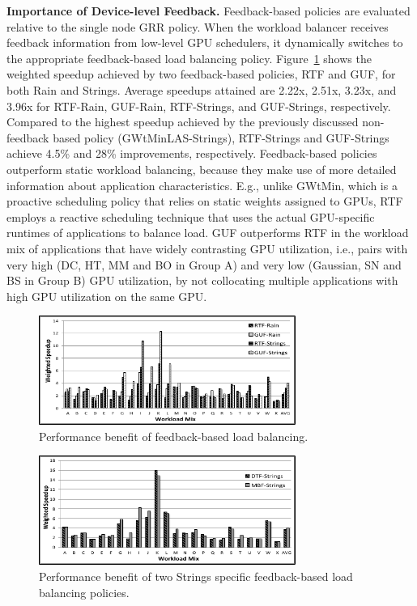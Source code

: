 \textbf{Importance of Device-level Feedback.} Feedback-based policies are evaluated relative to the single node GRR policy. When the workload  balancer  receives  feedback  information from low-level GPU schedulers, it dynamically switches to the appropriate  feedback-based  load  balancing policy.  Figure~\ref{fig:strings_exp6} shows the weighted speedup achieved by two feedback-based policies, RTF and GUF, for both Rain and Strings. Average speedups attained are 2.22x, 2.51x, 3.23x, and 3.96x for RTF-Rain, GUF-Rain, RTF-Strings, and GUF-Strings, respectively. Compared to the highest speedup achieved by the previously discussed non-feedback based policy (GWtMinLAS-Strings), RTF-Strings and GUF-Strings achieve 4.5\% and 28\% improvements, respectively. Feedback-based policies outperform static workload balancing, because they make use of more detailed information about application characteristics. E.g., unlike GWtMin, which is a proactive scheduling policy that relies on static weights assigned to GPUs, RTF employs a reactive scheduling technique that uses the actual GPU-specific runtimes of applications to balance load. GUF outperforms RTF in the workload mix of applications that have widely contrasting GPU utilization, i.e., pairs with very high (DC, HT, MM and BO in Group A) and very low (Gaussian, SN and BS in Group B) GPU utilization, by not collocating multiple applications with high GPU utilization on the same GPU.
\begin{figure}[t]
\centering
\includegraphics[width=0.75\textwidth,height=\textheight,keepaspectratio]{figures/strings_exp6.pdf}
\caption{Performance benefit of feedback-based load balancing.}
\label{fig:strings_exp6}
\end{figure}
\begin{figure}[t]
\centering
\includegraphics[width=0.75\textwidth,height=\textheight,keepaspectratio]{figures/strings_exp7.pdf}
\caption{Performance benefit of two Strings specific feedback-based load balancing policies.}
\label{fig:strings_exp7}
\end{figure}

